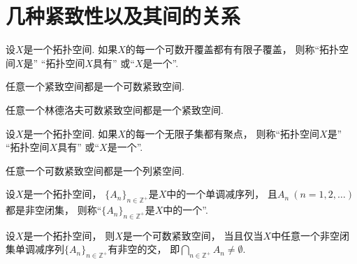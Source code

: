 \section{几种紧致性以及其间的关系}
\begin{definition}
设\(X\)是一个拓扑空间.
如果\(X\)的每一个可数开覆盖都有有限子覆盖，
则称“拓扑空间\(X\)是”
“拓扑空间\(X\)具有”
或“\(X\)是一个”.
\end{definition}

\begin{theorem}
任意一个紧致空间都是一个可数紧致空间.
\end{theorem}

\begin{theorem}
任意一个林德洛夫可数紧致空间都是一个紧致空间.
\end{theorem}

\begin{definition}
设\(X\)是一个拓扑空间.
如果\(X\)的每一个无限子集都有聚点，
则称“拓扑空间\(X\)是”
“拓扑空间\(X\)具有”
或“\(X\)是一个”.
\end{definition}

\begin{theorem}
任意一个可数紧致空间都是一个列紧空间.
\end{theorem}

\begin{definition}
设\(X\)是一个拓扑空间，
\(\{A_n\}_{n\in\mathbb{Z}^+}\)是\(X\)中的一个单调减序列，
且\(A_n\ (n=1,2,\dotsc)\)都是非空闭集，
则称“\(\{A_n\}_{n\in\mathbb{Z}^+}\)是\(X\)中的一个”.
\end{definition}

\begin{lemma}
设\(X\)是一个拓扑空间，
则\(X\)是一个可数紧致空间，
当且仅当\(X\)中任意一个非空闭集单调减序列\(\{A_n\}_{n\in\mathbb{Z}^+}\)有非空的交，
即\(\bigcap_{n\in\mathbb{Z}^+} A_n \neq \emptyset\).
\end{lemma}

